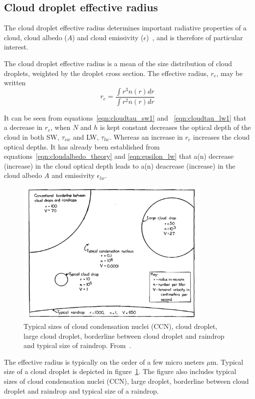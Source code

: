 \subsection{Cloud droplet effective radius}
The cloud droplet effective radius determines important radiative properties of a cloud, cloud albedo ($A$) and cloud emissivity ($\epsilon$)~\citep{Hansen1974}, and is therefore of particular interest. 

The cloud droplet effective radius is a mean of the size distribution of cloud droplets, weighted by the droplet cross section. The effective radius, $r_e$, may be written
\begin{equation}
r_e = \frac{\int r^3 n(r) dr}{\int r^2 n(r) dr}
\end{equation}

It can be seen from equations~\ref{eqn:cloudtau_sw1} and ~\ref{eqn:cloudtau_lw1} that a decrease in $r_e$, when $N$ and $h$ is kept constant decreases the optical depth of the cloud in both SW, $\tau_{sw}$ and LW, $\tau_{lw}$. Whereas an increase in $r_e$ increases the cloud optical depths. It has already been established from equations~\ref{eqn:cloudalbedo_theory} and \ref{eqn:epsilon_lw} that a(n) decrease (increase) in the cloud optical depth leads to a(n) deacrease (increase) in the cloud albedo $A$ and emissivity $\epsilon_{lw}$.

\begin{figure}
\centering
\includegraphics[width=0.85\textwidth]{theory/dropletsize.png}
\caption{Typical sizes of cloud condensation nuclei (CCN), cloud droplet, large cloud droplet, borderline between cloud droplet and raindrop and typical size of raindrop.%
 From~\citep{McDonald1958}.}
\label{fig:dropletsize}
\end{figure}
The effective radius is typically on the order of a few micro meters $\mu\text{m}$. Typical size of a cloud droplet is depicted in figure~\ref{fig:dropletsize}. The figure also includes typical sizes of cloud condensation nuclei (CCN), large droplet, borderline between cloud droplet and raindrop and typical size of a raindrop.


